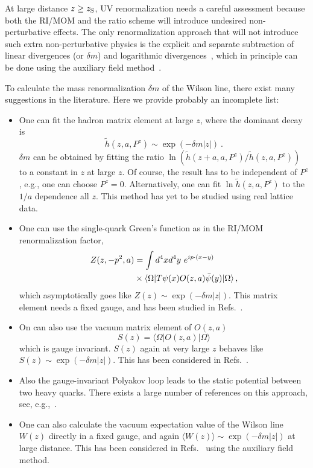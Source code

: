 At large distance $z\ge z_{\rm S}$, UV renormalization
needs a careful assessment because both the RI/MOM and the ratio scheme will introduce
undesired non-perturbative effects.
The only renormalization approach that will not introduce such extra non-perturbative physics
is the explicit and separate subtraction of linear divergences (or $\delta m$)
and logarithmic divergences~\cite{Chen:2016fxx,Ji:2017oey,Ishikawa:2017faj,Green:2017xeu},
which in principle can be done using the auxiliary field method~\cite{Green:2017xeu,Green:2020xco}.

To calculate the mass renormalization $\delta m$
of the Wilson line, there exist many
suggestions in the literature. Here we provide probably an incomplete list:

\begin{itemize}
\item{One can fit the hadron matrix element
at large $z$, where the dominant decay is
\begin{equation}\label{eq:mass1}
  \tilde h(z,a, P^z) \sim \exp(-\delta m |z|) \ .
\end{equation}
$\delta m$ can be obtained by fitting the ratio $\ln (\tilde h(z+a,a, P^z)/\tilde h(z,a, P^z))$
to a constant in $z$ at large $z$. Of course, the result has to be independent of $P^z$,
e.g., one can choose $P^z=0$. Alternatively, one can fit $\ln \tilde h(z,a, P^z)$ to the $1/a$
dependence all $z$. This method has yet to be studied using real lattice data.}
\item{One can use the single-quark Green's function
as in the RI/MOM renormalization factor,
\begin{align}
          Z(z,-p^2,a)&=\int d^4x d^4y\ e^{ip\cdot (x-y)}\nonumber\\
          &\times  \langle \Omega|T\psi(x) O(z,a) \bar{\psi}(y)|\Omega\rangle\,,
\end{align}
which asymptotically goes like $Z(z) \sim \exp(-\delta m |z|)$. This matrix element needs a fixed gauge,
and has been studied in Refs.~\cite{Izubuchi:2019lyk,Huo:2019vdl}.}
\item{On can also use the vacuum matrix element of $O(z,a)$
\begin{equation}
        S(z) = \langle \Omega|O(z,a)|\Omega\rangle
\end{equation}
which is gauge invariant. $S(z)$ again at very large $z$ behaves like
$S(z) \sim \exp(-\delta m |z|)$. This has been considered in Refs.~\cite{Braun:2018brg,Li:2020xml}.
}
\item{Also the gauge-invariant Polyakov loop leads to the static potential between two heavy quarks. There exists a large number of references on this approach, see, e.g.,~\cite{Appelquist:1977tw,Schroder:1999xf,Smirnov:2009fh,Philipsen:2002az,Jahn:2004qr}.}
\item{One can also calculate the vacuum expectation value
of the Wilson line $W(z)$ directly in a fixed gauge,
and again $\langle W(z) \rangle \sim \exp(-\delta m |z|)$ at large distance. This has been considered in Refs.~\cite{Green:2017xeu,Green:2020xco} using the auxiliary field method.}
\end{itemize}
